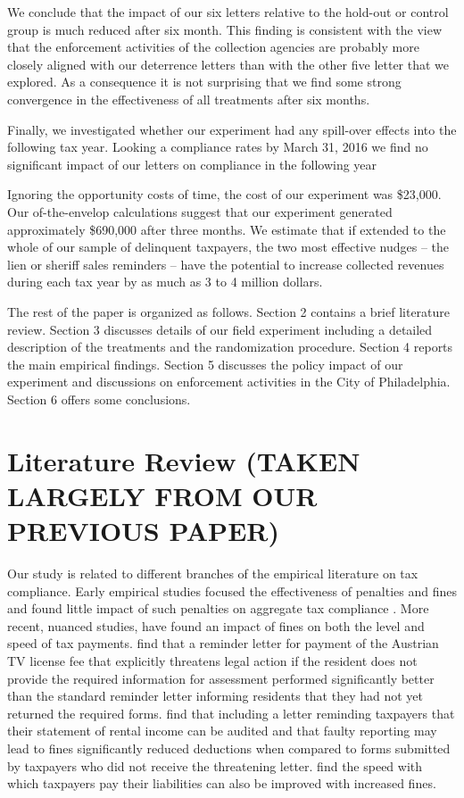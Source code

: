 \documentclass[12pt]{article}
\begin{document}
We conclude that the impact of our six letters relative to the
hold-out or control group is much reduced after six month. This
finding is consistent with the view that the enforcement activities of
the collection agencies are probably more closely aligned with our
deterrence letters than with the other five letter that we
explored. As a consequence it is not surprising that we find some
strong convergence in the effectiveness of all treatments after six
months.

Finally, we investigated whether our experiment had any spill-over effects
into the following tax year. Looking a compliance rates by March 31,
2016 we find no significant impact of our letters on compliance in the
following year

Ignoring the opportunity costs of time, the cost of our experiment was
\$23,000.  Our of-the-envelop calculations suggest that our experiment
generated approximately \$690,000 after three months. We estimate that
if extended to the whole of our sample of delinquent taxpayers, the
two most effective nudges -- the lien or sheriff sales reminders --
have the potential to increase collected revenues during each tax year
by as much as 3 to 4 million dollars.

The rest of the paper is organized as follows. Section 2 contains a
brief literature review. Section 3 discusses details of our field
experiment including a detailed description of the treatments and the
randomization procedure. Section 4 reports the main empirical
findings. Section 5 discusses the policy impact of our experiment and
discussions on enforcement activities in the City of
Philadelphia. Section 6 offers some conclusions.
    

\section{Literature Review (TAKEN LARGELY FROM OUR PREVIOUS PAPER)}

Our study is related to different branches of the empirical literature
on tax compliance. Early empirical studies focused the effectiveness
of penalties and fines and found little impact of such penalties on
aggregate tax compliance \cite{Slemrod-07}.  More recent, nuanced
studies, have found an impact of fines on both the level and speed of
tax payments.   find that a reminder letter for
payment of the Austrian TV license fee that explicitly threatens legal
action if the resident does not provide the required information for
assessment performed significantly better than the standard reminder
letter informing residents that they had not yet returned the required
forms.   find that including a letter
reminding taxpayers that their statement of rental income can be
audited and that faulty reporting may lead to fines significantly
reduced deductions when compared to forms submitted by taxpayers who
did not receive the threatening letter.   find
the speed with which taxpayers pay their liabilities can also be
improved with increased fines.
\end{document}
